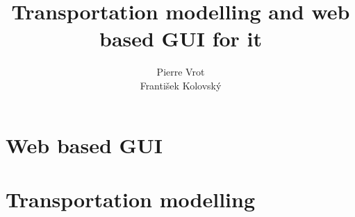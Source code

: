\documentclass[12pt,a4paper]{article}
\author{Pierre Vrot \\ František Kolovský}
\title{Transportation modelling and web based GUI for it}
\begin{document}
\maketitle
\newpage
\tableofcontents
\newpage

\section{Web based GUI}

\section{Transportation modelling}


\end{document}
